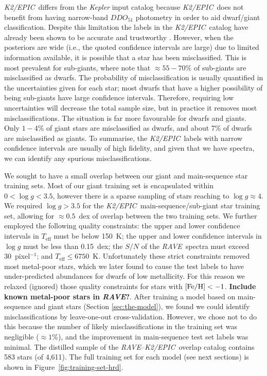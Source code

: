 \documentclass[preprint,trackchanges]{aastex}
\newcommand{\acronym}[1]{{\small{#1}}}
\newcommand{\project}[1]{\textsl{#1}}
\newcommand{\rave}{\project{\acronym{RAVE}}}
\newcommand{\epic}{\project{K2/EPIC}}
\newcommand{\stub}[1]{{\color{blue} \textbf{#1}}}
\newcommand{\teff}{T_{\mathrm{eff}}}
\newcommand{\logg}{\log g}
\begin{document}
\epic\ differs from the \project{Kepler} input catalog because \epic\ does not 
benefit from having narrow-band $DDO_{51}$ photometry in order to aid dwarf/giant 
classification.  Despite this limitation the labels in the \epic\ catalog have 
already been shown to be accurate and trustworthy \citep{Huber_2016}.  However, 
when the posteriors are wide (i.e., the quoted confidence intervals are large) 
due to limited information available, it is possible that a star has been 
misclassified.  This is most prevalent for sub-giants, where \citet{Huber_2016} 
note that $\approx55-70$\% of sub-giants are misclassified as dwarfs.  The 
probability of misclassification is usually quantified in the uncertainties given
for each star; most dwarfs that have a higher possibility of being sub-giants have
large confidence intervals.  Therefore, requiring low uncertainties will decrease 
the total sample size, but in practice it removes most misclassifications.  The 
situation is far more favourable for dwarfs and giants.  Only $1-4$\% of giant 
stars are misclassified as dwarfs, and about 7\% of dwarfs are misclassified as 
giants.  To summarise, the \epic\ labels with narrow confidence intervals are 
usually of high fidelity, and given that we have spectra, we can identify any
spurious misclassifications.


We sought to have a small overlap between our giant and main-sequence star training
sets.  Most of our giant training set is encapsulated within $0 < \logg < 3.5$, 
however there is a sparse sampling of stars reaching to $\logg \approx 4$.  We
required $\logg > 3.5$ for the \epic\ main-sequence/sub-giant star training set,
allowing for $\approx0.5$~dex of overlap between the two training sets.  We further
employed the following quality constraints: the upper and lower confidence intervals 
in $\teff$ must be below 150~K; the upper and lower confidence intervals in $\logg$ 
must be less than 0.15~dex; the $S/N$ of the \rave\ spectra must exceed 
30~pixel$^{-1}$; and $\teff \leqslant 6750$~K.  Unfortunately these strict constraints
removed most metal-poor stars, which we later found to cause the test labels to have
under-predicted abundances for dwarfs of low metallicity.  For this reason we relaxed
(ignored) those quality constraints for stars with $[{\rm Fe/H}] < -1$.  
\stub{Include known metal-poor stars in \rave?}. After training
a model based on main-sequence and giant stars (Section \ref{sec:the-model}), we found 
we could identify misclassifications by leave-one-out cross-validation.  However, we 
chose not to do this because the number of likely misclassifications in the training
set was negligible ($\approx1$\%), and the improvement in main-sequence test set labels
was minimal.  The distilled sample of the \rave--\epic\ overlap catalog contains 583 
stars (of 4,611).  The full training set for each model (see next sections) is shown
in Figure~\ref{fig:training-set-hrd}.
\end{document}
